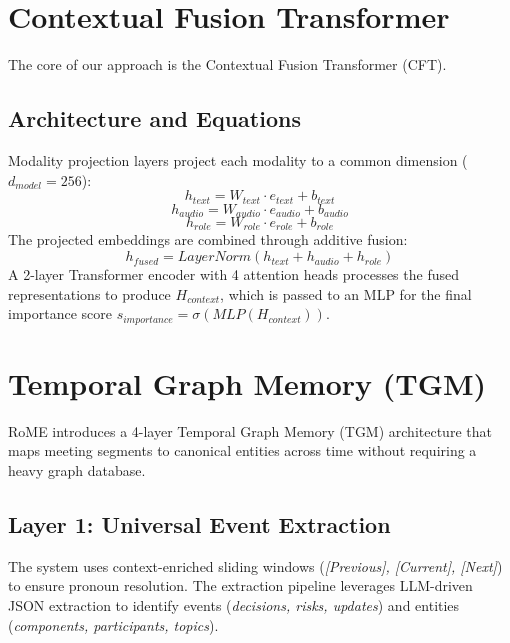 \section{Contextual Fusion Transformer}
The core of our approach is the Contextual Fusion Transformer (CFT).
\subsection{Architecture and Equations}
Modality projection layers project each modality to a common dimension ($d_{model} = 256$):
\begin{equation}
h_{text} = W_{text} \cdot e_{text} + b_{text}
\end{equation}
\begin{equation}
h_{audio} = W_{audio} \cdot e_{audio} + b_{audio}
\end{equation}
\begin{equation}
h_{role} = W_{role} \cdot e_{role} + b_{role}
\end{equation}
The projected embeddings are combined through additive fusion:
\begin{equation}
h_{fused} = LayerNorm(h_{text} + h_{audio} + h_{role})
\end{equation}
A 2-layer Transformer encoder with 4 attention heads processes the fused representations to produce $H_{context}$, which is passed to an MLP for the final importance score $s_{importance} = \sigma(MLP(H_{context}))$.

\section{Temporal Graph Memory (TGM)}
\noindent
RoME introduces a 4-layer Temporal Graph Memory (TGM) architecture that maps meeting segments to canonical entities across time without requiring a heavy graph database.

\subsection{Layer 1: Universal Event Extraction}
The system uses context-enriched sliding windows (\textit{[Previous], [Current], [Next]}) to ensure pronoun resolution. The extraction pipeline leverages LLM-driven JSON extraction to identify events (\textit{decisions, risks, updates}) and entities (\textit{components, participants, topics}).

